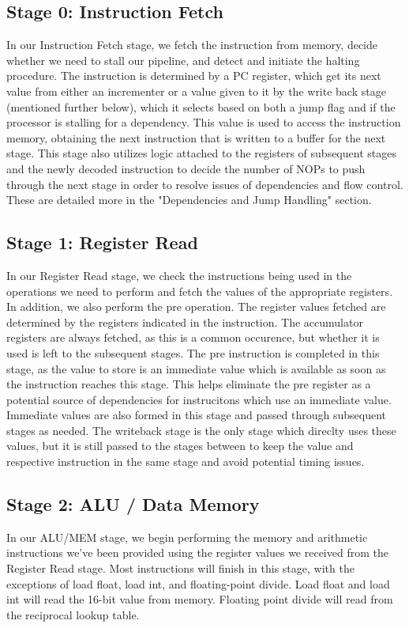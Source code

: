 \documentclass[sigconf]{acmart}
\begin{document}
\subsection{Stage 0: Instruction Fetch}
In our Instruction Fetch stage, we fetch the instruction from memory, decide whether we need to stall our pipeline, and detect and initiate the halting procedure. The instruction is determined by a PC register, which get its next value from either an incrementer or a value given to it by the write back stage (mentioned further below), which it selects based on both a jump flag and if the processor is stalling for a dependency. This value is used to access the instruction memory, obtaining the next instruction that is written to a buffer for the next stage. This stage also utilizes logic attached to the registers of subsequent stages and the newly decoded instruction to decide the number of NOPs to push through the next stage in order to resolve issues of dependencies and flow control. These are detailed more in the "Dependencies and Jump Handling" section.

\subsection{Stage 1: Register Read}
In our Register Read stage, we check the instructions being used in the operations we need to perform and fetch the values of the appropriate registers. In addition, we also perform the pre operation. The register values fetched are determined by the registers indicated in the instruction. The accumulator registers are always fetched, as this is a common occurence, but whether it is used is left to the subsequent stages. The pre instruction is completed in this stage, as the value to store is an immediate value which is available as soon as the instruction reaches this stage. This helps eliminate the pre register as a potential source of dependencies for instrucitons which use an immediate value. Immediate values are also formed in this stage and passed through subsequent stages as needed. The writeback stage is the only stage which direclty uses these values, but it is still passed to the stages between to keep the value and respective instruction in the same stage and avoid potential timing issues.    

\subsection{Stage 2: ALU / Data Memory}
In our ALU/MEM stage, we begin performing the memory and arithmetic instructions we’ve been provided using the register values we received from the Register Read stage. Most instructions will finish in this stage, with the exceptions of load float, load int, and floating-point divide. Load float and load int will read the 16-bit value from memory. Floating point divide will read from the reciprocal lookup table.
\end{document}
